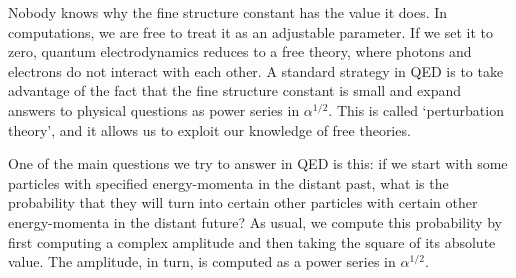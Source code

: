 \documentclass[12pt]{article}
\begin{document}
Nobody knows why the fine structure constant has the value it does.  In computations, we are free to treat it as an adjustable parameter.  If we set it to zero, quantum electrodynamics reduces to a free theory, where photons and electrons do not interact with each other.  A standard strategy in QED is to take advantage of the fact that the fine structure constant is small and expand answers to physical questions as power series in $\alpha^{1/2}$.  This is called `perturbation theory', and it allows us to exploit our knowledge of free theories. 

One of the main questions we try to answer in QED is this: if we start with some particles with specified energy-momenta in the distant past, what is the probability that they will turn into certain other particles with certain other energy-momenta in the distant future?   As usual, we compute this probability by first computing a complex amplitude and then taking the square of its absolute value.  The amplitude, in turn, is computed as a power series in $\alpha^{1/2}$.  
\end{document}
